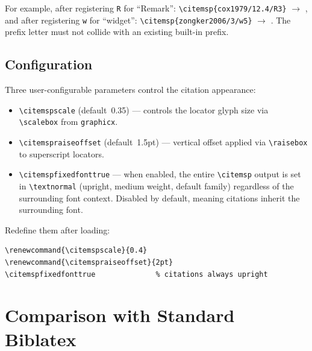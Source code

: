 \documentclass[11pt, a4paper]{article}
\renewcommand{\citemspscale}{0.5} %
\newcommand{\pkg}[1]{\texttt{#1}}
\newcommand{\cmd}[1]{\texttt{\textbackslash #1}}
\begin{document}
%
\noindent For example, after registering \texttt{R} for ``Remark'':
\verb|\citemsp{cox1979/12.4/R3}| $\longrightarrow$ ,\enspace
and after registering \texttt{w} for ``widget'':
\verb|\citemsp{zongker2006/3/w5}| $\longrightarrow$ .\enspace
The prefix letter must not collide with an existing built-in prefix.

\subsection{Configuration}

Three user-configurable parameters control the citation appearance:
\begin{itemize}[leftmargin=2em]
  \item \cmd{citemspscale} (default~0.35) --- controls the locator glyph
    size via \cmd{scalebox} from \pkg{graphicx}.
  \item \cmd{citemspraiseoffset} (default~1.5pt) --- vertical offset
    applied via \cmd{raisebox} to superscript locators.
  \item \cmd{citemspfixedfonttrue} --- when enabled, the entire
    \cmd{citemsp} output is set in \cmd{textnormal} (upright, medium
    weight, default family) regardless of the surrounding font context.
    Disabled by default, meaning citations inherit the surrounding font.
\end{itemize}

\noindent Redefine them after loading:
\begin{tcolorbox}[colback=gray!5, colframe=gray!40, boxrule=0.5pt, arc=2pt,
  top=6pt, bottom=6pt, left=10pt, right=10pt]
\begin{verbatim}
\renewcommand{\citemspscale}{0.4}
\renewcommand{\citemspraiseoffset}{2pt}
\citemspfixedfonttrue              % citations always upright
\end{verbatim}
\end{tcolorbox}


\section{Comparison with Standard Biblatex}
\end{document}
